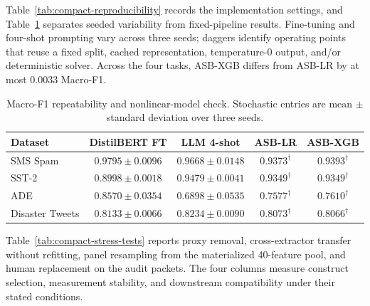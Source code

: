 Table~\ref{tab:compact-reproducibility} records the implementation settings, and Table~\ref{tab:compact-repeatability} separates seeded variability from fixed-pipeline results. Fine-tuning and four-shot prompting vary across three seeds; daggers identify operating points that reuse a fixed split, cached representation, temperature-0 output, and/or deterministic solver. Across the four tasks, ASB-XGB differs from ASB-LR by at most 0.0033 Macro-F1.

\begin{table}[!htbp]
\centering
\caption{Macro-F1 repeatability and nonlinear-model check. Stochastic entries are mean $\pm$ standard deviation over three seeds.}
\label{tab:compact-repeatability}
\small
\setlength{\tabcolsep}{5pt}
\begin{tabular}{@{}lcccc@{}}
\toprule
Dataset & DistilBERT FT & LLM 4-shot & ASB-LR & ASB-XGB \\
\midrule
SMS Spam & $0.9795\pm0.0096$ & $0.9668\pm0.0148$ & $0.9373^{\dagger}$ & $0.9393^{\dagger}$ \\
SST-2 & $0.8998\pm0.0018$ & $0.9479\pm0.0041$ & $0.9349^{\dagger}$ & $0.9349^{\dagger}$ \\
ADE & $0.8570\pm0.0354$ & $0.6898\pm0.0535$ & $0.7577^{\dagger}$ & $0.7610^{\dagger}$ \\
Disaster Tweets & $0.8133\pm0.0066$ & $0.8234\pm0.0090$ & $0.8073^{\dagger}$ & $0.8066^{\dagger}$ \\
\bottomrule
\end{tabular}
\end{table}

Table~\ref{tab:compact-stress-tests} reports proxy removal, cross-extractor transfer without refitting, panel resampling from the materialized 40-feature pool, and human replacement on the audit packets. The four columns measure construct selection, measurement stability, and downstream compatibility under their stated conditions.

\begin{table}[!htbp]
\centering
\caption{Supporting stress-test summary. Transfer values are Macro-F1 changes; human net is errors fixed minus errors introduced.}
\label{tab:compact-stress-tests}
\small
\setlength{\tabcolsep}{3.5pt}
\end{table}

